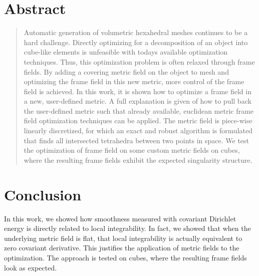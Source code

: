 \documentclass[a4paper,twoside,openright,11pt]{report}
\begin{document}
\chapter*{\centering Abstract}
\begin{quote}\noindent
  Automatic generation of volumetric hexahedral meshes continues
  to be a hard challenge. Directly optimizing for a decomposition 
  of an object into cube-like elements is unfeasible with todays
  available optimization techniques. Thus, this optimization problem is
  often relaxed through frame fields. By adding a covering
  metric field on the object to mesh and optimizing the frame field
  in this new metric, more control of the frame field is achieved.
  In this work, it is shown how to optimize a frame field in a
  new, user-defined metric. A full explanation is given of how to pull back
  the user-defined metric such that already available, euclidean metric frame field
  optimization techniques can be applied. The metric field is
  piece-wise linearly discretized, for which an exact and robust algorithm
  is formulated that finds all intersected tetrahedra between two points in space.
  We test the optimization of frame field on some custom metric fields
  on cubes, where the resulting frame fields exhibit the expected singularity structure.

\end{quote}

\cleardoublepage


\tableofcontents


\cleardoublepage









\chapter{Conclusion}
\label{ch:conclusion}
In this work, we showed how smoothness measured with covariant Dirichlet
energy is directly related to local integrability. In fact, we showed
that when the underlying metric field is flat, that local integrability
is actually equivalent to zero covariant derivative. This justifies
the application of metric fields to the optimization.
The approach is tested on cubes, where the resulting frame fields
look as expected.
\end{document}
